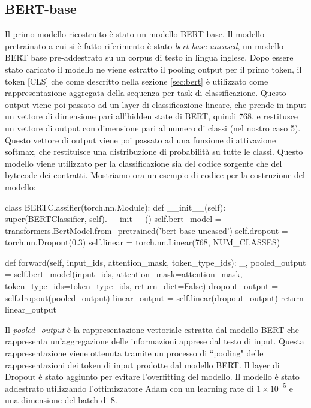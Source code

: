 \documentclass[../../Thesis.tex]{subfiles}
\begin{document}
\subsection{BERT-base}
Il primo modello ricostruito \`e stato un modello BERT base. Il modello pretrainato a cui si \`e fatto riferimento \`e stato \textit{bert-base-uncased}, un modello BERT base pre-addestrato su un corpus di testo in lingua inglese. Dopo essere stato caricato il modello ne viene estratto il pooling output per il primo token, il token [CLS] che come descritto nella sezione \ref{sec:bert} \`e utilizzato come rappresentazione aggregata della sequenza per task di classificazione. Questo output viene poi passato ad un layer di classificazione lineare, che prende in input un vettore di dimensione pari all'hidden state di BERT, quindi 768, e restitusce un vettore di output con dimensione pari al numero di classi (nel nostro caso 5). Questo vettore di output viene poi passato ad una funzione di attivazione softmax, che restituisce una distribuzione di probabilit\`a su tutte le classi. Questo modello viene utilizzato per la classificazione sia del codice sorgente che del bytecode dei contratti. Mostriamo ora un esempio di codice per la costruzione del modello: 
\begin{python}
    class BERTClassifier(torch.nn.Module):
    def __init__(self):
        super(BERTClassifier, self).__init__()
        self.bert_model = transformers.BertModel.from_pretrained('bert-base-uncased')
        self.dropout = torch.nn.Dropout(0.3)
        self.linear = torch.nn.Linear(768, NUM_CLASSES)
    
    def forward(self, input_ids, attention_mask, token_type_ids):
        _, pooled_output = self.bert_model(input_ids, attention_mask=attention_mask, token_type_ids=token_type_ids, return_dict=False)
        dropout_output = self.dropout(pooled_output)
        linear_output = self.linear(dropout_output)
        return linear_output
\end{python}
Il \emph{pooled\_output} \`e la rappresentazione vettoriale estratta dal modello BERT che rappresenta un'aggregazione delle informazioni apprese dal testo di input. Questa rappresentazione viene ottenuta tramite un processo di ``pooling" delle rappresentazioni dei token di input prodotte dal modello BERT.
Il layer di Dropout \`e stato aggiunto per evitare l'overfitting del modello. Il modello \`e stato addestrato utilizzando l'ottimizzatore Adam con un learning rate di $1 \times 10^{-5}$ e una dimensione del batch di 8.
\end{document}
